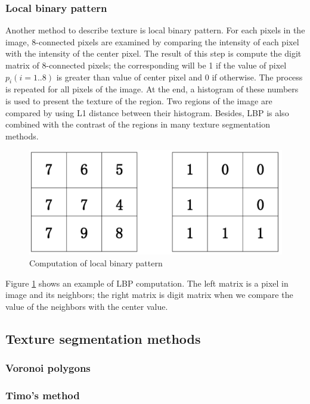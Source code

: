 \subsubsection{Local binary pattern}
Another method to describe texture is local binary pattern. For each pixels in the image, 8-connected pixels are examined by comparing the intensity of each pixel with the intensity of the center pixel. The result of this step is compute the digit matrix of 8-connected pixels; the corresponding will be 1 if the value of pixel $p_i (i=1..8)$ is greater than value of center pixel and 0 if otherwise. The process is repeated for all pixels of the image. At the end, a histogram of these numbers is used to present the texture of the region. Two regions of the image are compared by using L1 distance between their histogram. Besides, LBP is also combined with the contrast of the regions in many texture segmentation methods.
\begin{figure}[h]
	\centering
	\includegraphics[scale=0.4]{images/lbp}
	\caption{Computation of local binary pattern}
	\label{figlbp}
\end{figure}
Figure \ref{figlbp} shows an example of LBP computation. The left matrix is a pixel in image and its neighbors; the right matrix is digit matrix when we compare the value of the neighbors with the center value. 
\subsection{Texture segmentation methods}
\subsubsection{Voronoi polygons}
\subsubsection{Timo's method}